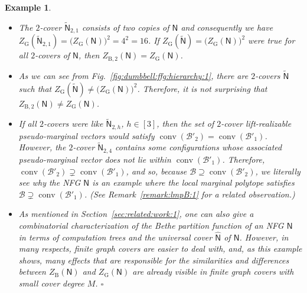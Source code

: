 \documentclass[journal, twocolumn]{IEEEtran}
\newcommand{\graph}[1]{\mathsf{#1}}
\newcommand{\lmpB}{\mathcal{B}}
\newcommand{\lmpBdown}[1]{\mathcal{B}'_{#1}}
\newcommand{\graphN}{\graph{N}}
\newcommand{\convhull}{\operatorname{conv}}
\newcommand{\ZBethe}{Z_{\mathrm{B}}}
\newcommand{\ZBetheM}[1]{Z_{\mathrm{B}, #1}}
\newcommand{\cover}[1]{\tilde{#1}}
\newcommand{\cgraph}[1]{\cover{\graph{#1}}}
\newcommand{\?}{\mathrm{?}}
\newcommand{\qedwhite}{\hspace*{\fill}%
  $\square$\smallskip}
\newcommand{\exampleend}{\qedwhite}
\newcommand{\ZGibbs}{Z_{\mathrm{G}}}
\newtheorem{Example}[Lemma]{Example}
\begin{document}
\begin{Example}
\begin{itemize}
  \item The $2$-cover $\cgraph{N}_{2,1}$ consists of two copies of $\graphN$
    and consequently we have $\ZGibbs(\cgraph{N}_{2,1}) = \bigl(
    \ZGibbs(\graphN) \bigr)^2 = 4^2 = 16$. If $\ZGibbs(\cgraph{N}) = \bigl(
    \ZGibbs(\graphN) \bigr)^2$ were true for all $2$-covers of $\graphN$, then
    $\ZBetheM{2}(\graphN) = \ZGibbs(\graphN)$.

  \item As we can see from Fig.~\ref{fig:dumbbell:ffg:hierarchy:1}, there are
    $2$-covers $\cgraph{N}$ such that $\ZGibbs(\cgraph{N}) \neq \bigl(
    \ZGibbs(\graphN) \bigr)^2$. Therefore, it is not surprising that
    $\ZBetheM{2}(\graphN) \neq \ZGibbs(\graphN)$.

  \item If all $2$-covers were like $\cgraph{N}_{2,h}$, $h \in [3]$, then the
    set of $2$-cover lift-realizable pseudo-marginal vectors would satisfy
    $\convhull(\lmpBdown{2}) = \convhull(\lmpBdown{1})$. However, the $2$-cover
    $\cgraph{N}_{2,4}$ contains some configurations whose associated
    pseudo-marginal vector does not lie within
    $\convhull(\lmpBdown{1})$. Therefore, $\convhull(\lmpBdown{2}) \supsetneq
    \convhull(\lmpBdown{1})$, and so, because $\lmpB \supseteq
    \convhull(\lmpBdown{2})$, we literally see why the NFG $\graphN$ is an example
    where the local marginal polytope satisfies $\lmpB \supsetneq
    \convhull(\lmpBdown{1})$. (See Remark~\ref{remark:lmpB:1} for a related
    observation.)

  \item As mentioned in Section~\ref{sec:related:work:1}, one can also give a
    combinatorial characterization of the Bethe partition function of an NFG
    $\graphN$ in terms of computation trees and the universal cover
    $\graph{\hat N}$ of $\graphN$. However, in many respects, finite graph
    covers are easier to deal with, and, as this example shows, many effects
    that are responsible for the similarities and differences between
    $\ZBethe(\graphN)$ and $\ZGibbs(\graphN)$ are already visible in finite
    graph covers with small cover degree $M$.  \exampleend

  \end{itemize}
\end{Example}
\end{document}
